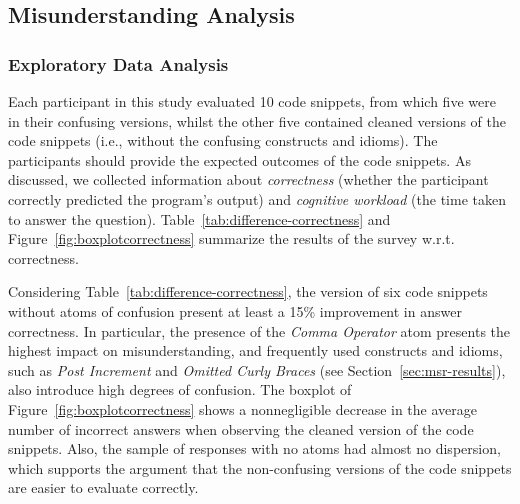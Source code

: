 \subsection{Misunderstanding Analysis}

\subsubsection*{Exploratory Data Analysis}

Each participant in this study evaluated 10 code snippets, from which five were in their confusing versions, whilst the other five contained cleaned versions of the code snippets (i.e., without the confusing constructs and idioms). The participants should provide the expected outcomes of the code snippets. As discussed, we collected information about \emph{correctness} (whether the participant correctly predicted the program's output) and \emph{cognitive workload} (the time taken to answer the question). 
Table~\ref{tab:difference-correctness} and Figure~\ref{fig:boxplotcorrectness} summarize the results of the survey w.r.t. correctness.

Considering Table~\ref{tab:difference-correctness}, the version of six code snippets without atoms of confusion present at least a 15\% improvement in answer correctness. In particular, the presence of the \emph{Comma Operator} atom presents the highest impact on
misunderstanding, and  
frequently used constructs and idioms, such as \emph{Post Increment} and \emph{Omitted Curly Braces} (see Section~\ref{sec:msr-results}), also introduce high degrees of confusion.
The boxplot of Figure~\ref{fig:boxplotcorrectness} shows a nonnegligible decrease in the average number of incorrect answers when observing the cleaned version of the code snippets. Also, the sample of responses with no atoms had almost no dispersion, which supports the
argument that the non-confusing versions of the code snippets are
easier to evaluate correctly. 


